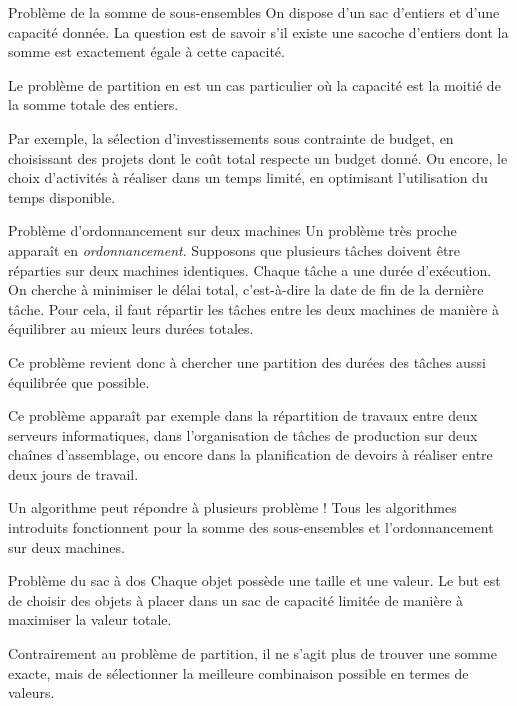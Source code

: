 \documentclass[a4paper,twoside]{article}
\begin{document}
\begin{definition}{Problème de la somme de sous-ensembles}
  On dispose d'un sac d'entiers et d'une capacité donnée.
  La question est de savoir s'il existe une sacoche d'entiers dont la
  somme est exactement égale à cette capacité.

  Le problème de partition en est un cas particulier où la capacité est la moitié de la somme totale des entiers.
\end{definition}

Par exemple, la sélection d'investissements sous contrainte de budget, en choisissant des projets dont le coût total respecte un budget donné.
Ou encore, le choix d'activités à réaliser dans un temps limité, en optimisant l'utilisation du temps disponible.

\begin{definition}{Problème d'ordonnancement sur deux machines}
  Un problème très proche apparaît en \emph{ordonnancement}.
  Supposons que plusieurs tâches doivent être réparties sur deux machines identiques.
  Chaque tâche a une durée d'exécution.
  On cherche à minimiser le délai total, c'est-à-dire la date de fin de la dernière tâche.
  Pour cela, il faut répartir les tâches entre les deux machines de manière à équilibrer au mieux leurs durées totales.

  Ce problème revient donc à chercher une partition des durées des tâches aussi équilibrée que possible.
\end{definition}

Ce problème apparaît par exemple dans la répartition de travaux entre deux serveurs informatiques, dans l'organisation de tâches de production sur deux chaînes d'assemblage, ou encore dans la planification de devoirs à réaliser entre deux jours de travail.

\begin{remarque}{Un algorithme peut répondre à plusieurs problème !}
  Tous les algorithmes introduits fonctionnent pour la somme des sous-ensembles et l'ordonnancement sur deux machines.
\end{remarque}


\begin{definition}{Problème du sac à dos}
  Chaque objet possède une taille et une valeur.
  Le but est de choisir des objets à placer dans un sac de capacité limitée de manière à maximiser la valeur totale.

  Contrairement au problème de partition, il ne s'agit plus de trouver une somme exacte, mais de sélectionner la meilleure combinaison possible en termes de valeurs.
\end{definition}
\end{document}

